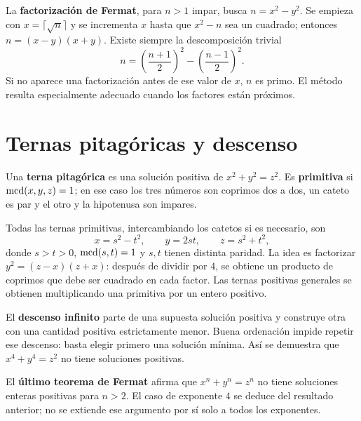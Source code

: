 La \textbf{factorización de Fermat}, para $n>1$ impar, busca
$n=x^2-y^2$. Se empieza con $x=\lceil\sqrt n\rceil$ y se incrementa
$x$ hasta que $x^2-n$ sea un cuadrado; entonces
$n=(x-y)(x+y)$.
Existe siempre la descomposición trivial
\[
 n=\left(\frac{n+1}{2}\right)^2-
   \left(\frac{n-1}{2}\right)^2.
\]
Si no aparece una factorización antes de ese valor de $x$, $n$ es primo.
El método resulta especialmente adecuado cuando los factores están próximos.

\section{Ternas pitagóricas y descenso}

Una \textbf{terna pitagórica} es una solución positiva de
$x^2+y^2=z^2$. Es \textbf{primitiva} si $\operatorname{mcd}(x,y,z)=1$;
en ese caso los tres números son coprimos dos a dos, un cateto es par
y el otro y la hipotenusa son impares.

Todas las ternas primitivas, intercambiando los catetos si es necesario, son
\[
 x=s^2-t^2,\qquad y=2st,\qquad z=s^2+t^2,
\]
donde $s>t>0$, $\operatorname{mcd}(s,t)=1$ y $s,t$ tienen distinta paridad.
La idea es factorizar $y^2=(z-x)(z+x)$: después de dividir por $4$,
se obtiene un producto de coprimos que debe ser cuadrado en cada factor.
Las ternas positivas generales se obtienen multiplicando una primitiva
por un entero positivo.

El \textbf{descenso infinito} parte de una supuesta solución positiva
y construye otra con una cantidad positiva estrictamente menor.
Buena ordenación impide repetir ese descenso: basta elegir primero
una solución mínima. Así se demuestra que $x^4+y^4=z^2$ no tiene
soluciones positivas.

El \textbf{último teorema de Fermat} afirma que
$x^n+y^n=z^n$ no tiene soluciones enteras positivas para $n>2$.
El caso de exponente $4$ se deduce del resultado anterior;
no se extiende ese argumento por sí solo a todos los exponentes.
